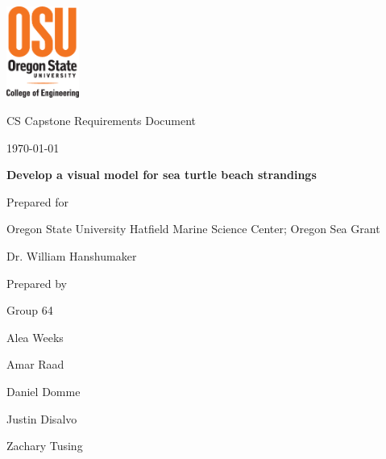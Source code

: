 \documentclass[onecolumn, draftclsnofoot,10pt, compsoc]{IEEEtran}
\def \CapstoneTeamName{		Beached Marine Critters Project Team}
\def \CapstoneTeamNumber{		64}
\def \GroupMemberOne{			Alea Weeks}
\def \GroupMemberTwo{			Amar Raad}
\def \GroupMemberThree{			Daniel Domme}
\def \GroupMemberFour{			Justin Disalvo}
\def \GroupMemberFive{			Zachary Tusing}
\def \CapstoneProjectName{		Develop a visual model for sea turtle beach strandings}
\def \CapstoneSponsorCompany{	Oregon State University Hatfield Marine Science Center; Oregon Sea Grant}
\def \CapstoneSponsorPerson{		Dr. William Hanshumaker}
\def \DocType{		%
				Requirements Document
				}
\newcommand{\NameSigPair}[1]{\par
\makebox[2.75in][r]{#1} \hfil 	\makebox[3.25in]{\makebox[2.25in]{\hrulefill} \hfill		\makebox[.75in]{\hrulefill}}
\par\vspace{-12pt} \textit{\tiny\noindent
\makebox[2.75in]{} \hfil		\makebox[3.25in]{\makebox[2.25in][r]{Signature} \hfill	\makebox[.75in][r]{Date}}}}
\renewcommand{\NameSigPair}[1]{#1}
\begin{document}
\begin{titlepage}
    \begin{singlespace}
     \includegraphics[height=3cm]{coe_v_spot1}
        \hfill 
        \par\vspace{.2in}
        \centering
        \scshape{
            \huge CS Capstone \DocType \par
            {\normalsize\today}\par
            \vspace{.5in}
            \textbf{\Huge\CapstoneProjectName}\par
            \vspace{1in}
            {\Large Prepared for}\par
            \huge \CapstoneSponsorCompany\par
            \vspace{5pt}
            {\Large\NameSigPair{\CapstoneSponsorPerson}\par}
            \vspace{.5in}
            {\large Prepared by }\par
            Group\CapstoneTeamNumber\par
            \vspace{5pt}
            {\Large
                \NameSigPair{\GroupMemberOne}\par
                \NameSigPair{\GroupMemberTwo}\par
                \NameSigPair{\GroupMemberThree}\par
				\NameSigPair{\GroupMemberFour}\par
			\NameSigPair{\GroupMemberFive}\par
            }
            \vspace{20pt}
        }
        \vfill
        \begin{abstract}

\end{abstract}
\end{singlespace}
\end{titlepage}
\end{document}
